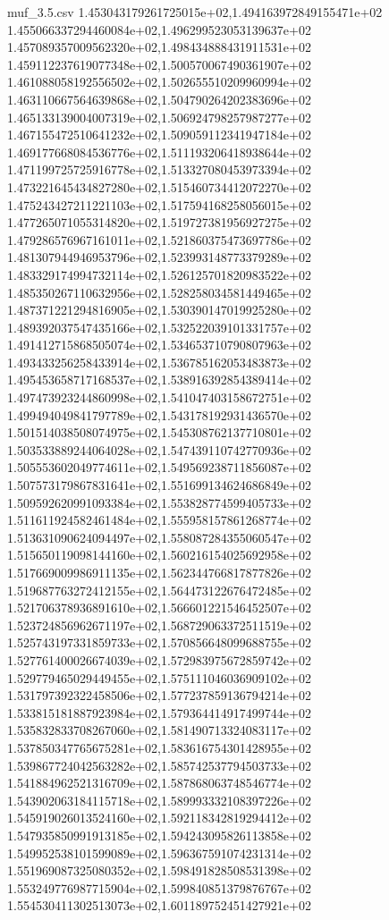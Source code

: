 \begin{filecontents*}{muf_3.5.csv}
1.453043179261725015e+02,1.494163972849155471e+02
1.455066337294460084e+02,1.496299523053139637e+02
1.457089357009562320e+02,1.498434888431911531e+02
1.459112237619077348e+02,1.500570067490361907e+02
1.461088058192556502e+02,1.502655510209960994e+02
1.463110667564639868e+02,1.504790264202383696e+02
1.465133139004007319e+02,1.506924798257987277e+02
1.467155472510641232e+02,1.509059112341947184e+02
1.469177668084536776e+02,1.511193206418938644e+02
1.471199725725916778e+02,1.513327080453973394e+02
1.473221645434827280e+02,1.515460734412072270e+02
1.475243427211221103e+02,1.517594168258056015e+02
1.477265071055314820e+02,1.519727381956927275e+02
1.479286576967161011e+02,1.521860375473697786e+02
1.481307944946953796e+02,1.523993148773379289e+02
1.483329174994732114e+02,1.526125701820983522e+02
1.485350267110632956e+02,1.528258034581449465e+02
1.487371221294816905e+02,1.530390147019925280e+02
1.489392037547435166e+02,1.532522039101331757e+02
1.491412715868505074e+02,1.534653710790807963e+02
1.493433256258433914e+02,1.536785162053483873e+02
1.495453658717168537e+02,1.538916392854389414e+02
1.497473923244860998e+02,1.541047403158672751e+02
1.499494049841797789e+02,1.543178192931436570e+02
1.501514038508074975e+02,1.545308762137710801e+02
1.503533889244064028e+02,1.547439110742770936e+02
1.505553602049774611e+02,1.549569238711856087e+02
1.507573179867831641e+02,1.551699134624686849e+02
1.509592620991093384e+02,1.553828774599405733e+02
1.511611924582461484e+02,1.555958157861268774e+02
1.513631090624094497e+02,1.558087284355060547e+02
1.515650119098144160e+02,1.560216154025692958e+02
1.517669009986911135e+02,1.562344766817877826e+02
1.519687763272412155e+02,1.564473122676472485e+02
1.521706378936891610e+02,1.566601221546452507e+02
1.523724856962671197e+02,1.568729063372511519e+02
1.525743197331859733e+02,1.570856648099688755e+02
1.527761400026674039e+02,1.572983975672859742e+02
1.529779465029449455e+02,1.575111046036909102e+02
1.531797392322458506e+02,1.577237859136794214e+02
1.533815181887923984e+02,1.579364414917499744e+02
1.535832833708267060e+02,1.581490713324083117e+02
1.537850347765675281e+02,1.583616754301428955e+02
1.539867724042563282e+02,1.585742537794503733e+02
1.541884962521316709e+02,1.587868063748546774e+02
1.543902063184115718e+02,1.589993332108397226e+02
1.545919026013524160e+02,1.592118342819294412e+02
1.547935850991913185e+02,1.594243095826113858e+02
1.549952538101599089e+02,1.596367591074231314e+02
1.551969087325080352e+02,1.598491828508531398e+02
1.553249776987715904e+02,1.599840851379876767e+02
1.554530411302513073e+02,1.601189752451427921e+02

\end{filecontents*}
